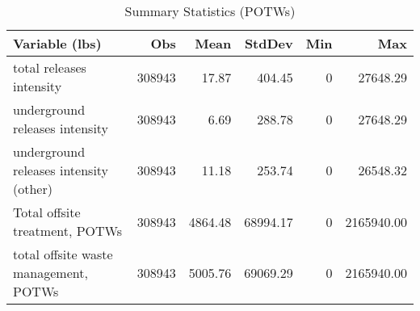 \begin{table}[H]
    \centering
    \caption{Summary Statistics (POTWs)}
    \label{tab:sumstat-potws}
    \begin{tabular}{lrrrrr}
        \toprule\toprule
        Variable (lbs)                         & Obs    & Mean    & StdDev   & Min & Max        \\ \midrule
        total releases intensity               & 308943 & 17.87   & 404.45   & 0   & 27648.29   \\
        underground releases intensity         & 308943 & 6.69    & 288.78   & 0   & 27648.29   \\
        underground releases intensity (other) & 308943 & 11.18   & 253.74   & 0   & 26548.32   \\
        Total offsite treatment, POTWs         & 308943 & 4864.48 & 68994.17 & 0   & 2165940.00 \\
        total offsite waste management, POTWs  & 308943 & 5005.76 & 69069.29 & 0   & 2165940.00 \\ \bottomrule \bottomrule
    \end{tabular}
\end{table}
